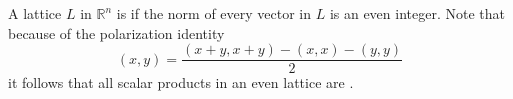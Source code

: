 \documentclass[12pt]{article}
\begin{document}
A lattice $L$ in $\mathbb{R}^n$ is  if the norm of every vector in $L$ is an even integer.  Note that because of the polarization identity $$(x,y) = \frac{(x+y,x+y) - (x,x) - (y,y)}{2}$$ it follows that all scalar products in an even lattice are .



\end{document}
